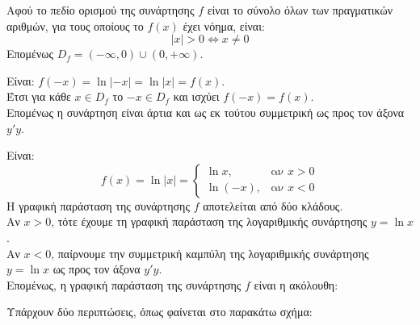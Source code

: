 \documentclass[11pt,a4paper,twoside]{book}
\begin{document}
\begin{alist}
\item Αφού το πεδίο ορισμού της συνάρτησης $f$ είναι το σύνολο όλων των πραγματικών αριθμών, για τους οποίους το $f(x)$ έχει νόημα, είναι:
\[|x| > 0 \Leftrightarrow x \ne 0\]
Επομένως $D_f = (-\infty, 0) \cup (0, +\infty)$.
\item Είναι: $f(-x) = \ln|-x| = \ln|x| = f(x)$. \\
Έτσι για κάθε $x \in D_f$ το $-x \in D_f$ και ισχύει $f(-x) = f(x)$. \\
Επομένως η συνάρτηση είναι άρτια και ως εκ τούτου συμμετρική ως προς τον άξονα $y'y$.
\item Είναι: 
\[f(x) = \ln|x| = \begin{cases} \ln x, & \text{αν } x > 0 \\ \ln(-x), & \text{αν } x < 0 \end{cases}\]
Η γραφική παράσταση της συνάρτησης $f$ αποτελείται από δύο κλάδους. \\
Αν $x > 0$, τότε έχουμε τη γραφική παράσταση της λογαριθμικής συνάρτησης $y = \ln x$. \\
Αν $x < 0$, παίρνουμε την συμμετρική καμπύλη της λογαριθμικής συνάρτησης $y = \ln x$ ως προς τον άξονα $y'y$. \\
Επομένως, η γραφική παράσταση της συνάρτησης $f$ είναι η ακόλουθη:
\begin{center}
\end{center}
\item Υπάρχουν δύο περιπτώσεις, όπως φαίνεται στο παρακάτω σχήμα:
\end{alist}
\end{document}
